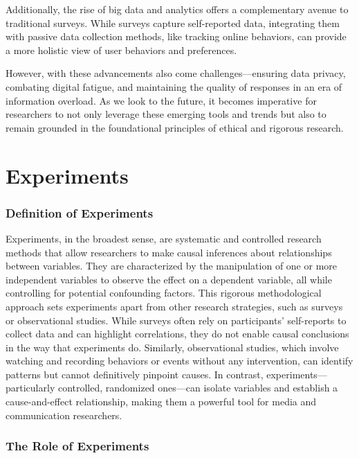 \documentclass[
  b5paper]{book}
\begin{document}
Additionally, the rise of big data and analytics offers a complementary avenue to traditional surveys. While surveys capture self-reported data, integrating them with passive data collection methods, like tracking online behaviors, can provide a more holistic view of user behaviors and preferences.

However, with these advancements also come challenges---ensuring data privacy, combating digital fatigue, and maintaining the quality of responses in an era of information overload. As we look to the future, it becomes imperative for researchers to not only leverage these emerging tools and trends but also to remain grounded in the foundational principles of ethical and rigorous research.

\hypertarget{experiments}{%
\chapter{Experiments}\label{experiments}}

\hypertarget{definition-of-experiments}{%
\subsection*{Definition of Experiments}\label{definition-of-experiments}}

Experiments, in the broadest sense, are systematic and controlled research methods that allow researchers to make causal inferences about relationships between variables. They are characterized by the manipulation of one or more independent variables to observe the effect on a dependent variable, all while controlling for potential confounding factors. This rigorous methodological approach sets experiments apart from other research strategies, such as surveys or observational studies. While surveys often rely on participants' self-reports to collect data and can highlight correlations, they do not enable causal conclusions in the way that experiments do. Similarly, observational studies, which involve watching and recording behaviors or events without any intervention, can identify patterns but cannot definitively pinpoint causes. In contrast, experiments---particularly controlled, randomized ones---can isolate variables and establish a cause-and-effect relationship, making them a powerful tool for media and communication researchers.

\hypertarget{the-role-of-experiments}{%
\subsection*{The Role of Experiments}\label{the-role-of-experiments}}
\end{document}
